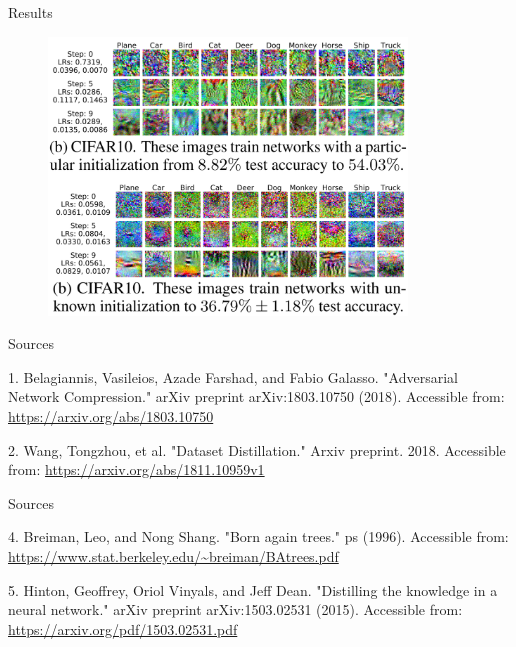 \documentclass{beamer}
\begin{document}
\begin{frame}{Results}
\begin{figure}[h]
\includegraphics[width=0.85\textwidth]{img/results2}
\end{figure}
\end{frame}
\begin{frame}{Sources}

\begin{thebibliography}{0}

   1. Belagiannis, Vasileios, Azade Farshad, and Fabio Galasso. "Adversarial Network Compression." arXiv preprint arXiv:1803.10750 (2018). Accessible from: \url{https://arxiv.org/abs/1803.10750}
  
   2. Wang, Tongzhou, et al. "Dataset Distillation." Arxiv preprint. 2018. Accessible from: \url{https://arxiv.org/abs/1811.10959v1}
  
  
\end{thebibliography}

\end{frame}


\begin{frame}{Sources}

\begin{thebibliography}{0}
   4. Breiman, Leo, and Nong Shang. "Born again trees." ps (1996). Accessible from: \url{https://www.stat.berkeley.edu/~breiman/BAtrees.pdf}
  
   5. Hinton, Geoffrey, Oriol Vinyals, and Jeff Dean. "Distilling the knowledge in a neural network." arXiv preprint arXiv:1503.02531 (2015). Accessible from: \url{https://arxiv.org/pdf/1503.02531.pdf}
  

\end{thebibliography}

\end{frame}
 
 
 
\end{document}
